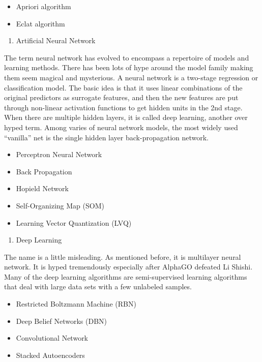 \documentclass[]{book}
\providecommand{\tightlist}{%
  \setlength{\itemsep}{0pt}\setlength{\parskip}{0pt}}
\theoremstyle{definition}
\theoremstyle{definition}
\theoremstyle{remark}
\begin{document}
\begin{itemize}
\tightlist
\item
  Apriori algorithm
\item
  Eclat algorithm
\end{itemize}

\begin{enumerate}
\def\labelenumi{\arabic{enumi}.}
\setcounter{enumi}{9}
\tightlist
\item
  Artificial Neural Network
\end{enumerate}

The term neural network has evolved to encompass a repertoire of models
and learning methods. There has been lots of hype around the model
family making them seem magical and mysterious. A neural network is a
two-stage regression or classification model. The basic idea is that it
uses linear combinations of the original predictors as surrogate
features, and then the new features are put through non-linear
activation functions to get hidden units in the 2nd stage. When there
are multiple hidden layers, it is called deep learning, another over
hyped term. Among varies of neural network models, the most widely used
``vanilla'' net is the single hidden layer back-propagation network.

\begin{itemize}
\tightlist
\item
  Perceptron Neural Network
\item
  Back Propagation
\item
  Hopield Network
\item
  Self-Organizing Map (SOM)
\item
  Learning Vector Quantization (LVQ)
\end{itemize}

\begin{enumerate}
\def\labelenumi{\arabic{enumi}.}
\setcounter{enumi}{10}
\tightlist
\item
  Deep Learning
\end{enumerate}

The name is a little misleading. As mentioned before, it is multilayer
neural network. It is hyped tremendously especially after AlphaGO
defeated Li Shishi. Many of the deep learning algorithms are
semi-supervised learning algorithms that deal with large data sets with
a few unlabeled samples.

\begin{itemize}
\tightlist
\item
  Restricted Boltzmann Machine (RBN)
\item
  Deep Belief Networks (DBN)
\item
  Convolutional Network
\item
  Stacked Autoencoders
\end{itemize}
\end{document}
